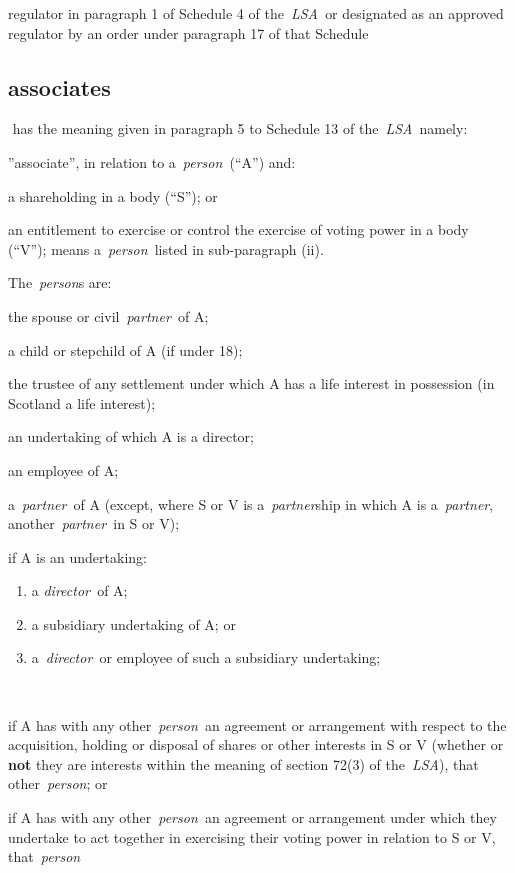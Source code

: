   regulator in paragraph 1 of Schedule 4 of the~\emph{LSA~}or designated
  as an approved regulator by an order under paragraph 17 of that
  Schedule  \subsection{associates } has the meaning given in paragraph 5 to Schedule
  13 of the~\emph{LSA}~namely: \rl \item ''associate'', in relation to
  a~\emph{person~}(``A'') and: \al \item a shareholding in a body (``S'');
  or
  \item an entitlement to exercise or control the exercise of voting
  power in a body (``V''); means a~\emph{person~}listed in sub-paragraph
  (ii).\la \item The~\emph{person}s are: \al
 \item  the spouse or
  civil~\emph{partner~}of A;
  \item a child or stepchild of A (if under
  18);
  \item the trustee of any settlement under which A has a life
  interest in possession (in Scotland a life interest);
\item an undertaking of which A is a director;
\item an employee of A;
\item a~\emph{partner~}of A (except, where S or V is a~\emph{partner}ship in
  which A is a~\emph{partner}, another~\emph{partner~}in S or V);
\item if A is an undertaking:
\begin{enumerate}[label=(\Roman*)]
\item a \emph{director~}of A;
\item a subsidiary
  undertaking of A; or
\item a~\emph{director~}or employee of such a subsidiary undertaking;
\end{enumerate} \item  if A has with any other~\emph{person~}an
  agreement or arrangement with respect to the acquisition, holding or
  disposal of shares or other interests in S or V (whether or \textbf{not} they
  are interests within the meaning of section 72(3) of the~\emph{LSA}),
  that other~\emph{person}; or \item if A has with any
  other~\emph{person~}an agreement or arrangement under which they
  undertake to act together in exercising their voting power in relation
  to S or V, that~\emph{person}\la\lr
